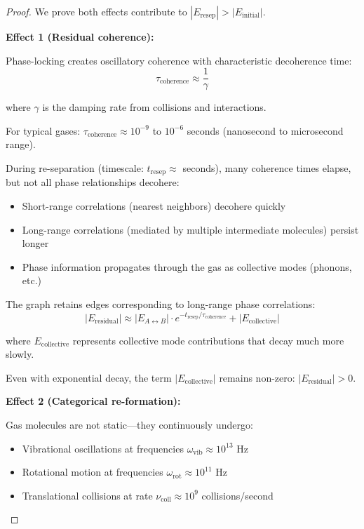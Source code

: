 \documentclass[12pt,a4paper]{article}
\theoremstyle{remark}
\begin{document}
\begin{proof}
We prove both effects contribute to $|E_{\text{resep}}| > |E_{\text{initial}}|$.

\textbf{Effect 1 (Residual coherence):}

Phase-locking creates oscillatory coherence with characteristic decoherence time:
\begin{equation}
\tau_{\text{coherence}} \approx \frac{1}{\gamma}
\end{equation}

where $\gamma$ is the damping rate from collisions and interactions.

For typical gases: $\tau_{\text{coherence}} \approx 10^{-9}$ to $10^{-6}$ seconds (nanosecond to microsecond range).

During re-separation (timescale: $t_{\text{resep}} \approx$ seconds), many coherence times elapse, but not all phase relationships decohere:
\begin{itemize}
\item Short-range correlations (nearest neighbors) decohere quickly
\item Long-range correlations (mediated by multiple intermediate molecules) persist longer
\item Phase information propagates through the gas as collective modes (phonons, etc.)
\end{itemize}

The graph retains edges corresponding to long-range phase correlations:
\begin{equation}
|E_{\text{residual}}| \approx |E_{A \leftrightarrow B}| \cdot e^{-t_{\text{resep}}/\tau_{\text{coherence}}} + |E_{\text{collective}}|
\end{equation}

where $E_{\text{collective}}$ represents collective mode contributions that decay much more slowly.

Even with exponential decay, the term $|E_{\text{collective}}|$ remains non-zero: $|E_{\text{residual}}| > 0$.

\textbf{Effect 2 (Categorical re-formation):}

Gas molecules are not static—they continuously undergo:
\begin{itemize}
\item Vibrational oscillations at frequencies $\omega_{\text{vib}} \approx 10^{13}$ Hz
\item Rotational motion at frequencies $\omega_{\text{rot}} \approx 10^{11}$ Hz
\item Translational collisions at rate $\nu_{\text{coll}} \approx 10^9$ collisions/second
\end{itemize}


\end{proof}
\end{document}
